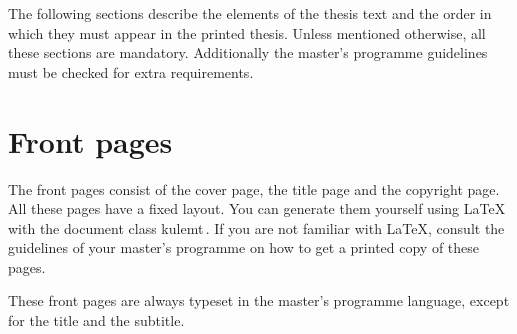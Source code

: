 \documentclass[11pt,article,oneside,a4paper]{memoir}
\newcommand*\cls[1]{\textsf{#1}}
\begin{document}
The following sections describe the elements of the thesis text and the
order in which they must appear in the printed thesis. Unless mentioned
otherwise, all these sections are mandatory. Additionally the master's programme
guidelines must be checked for extra requirements.

\section{Front pages}
The front pages consist of the cover page, the title page and the copyright
page. All these pages have a fixed layout. You can generate them yourself using
LaTeX with the document class \cls{kulemt}\,\cite{pkg:kulemt}. If you are not
familiar with LaTeX, consult the guidelines of your master's programme on how
to get a printed copy of these pages.

These front pages are always typeset in the master's programme language, except
for the title and the subtitle.
\end{document}
